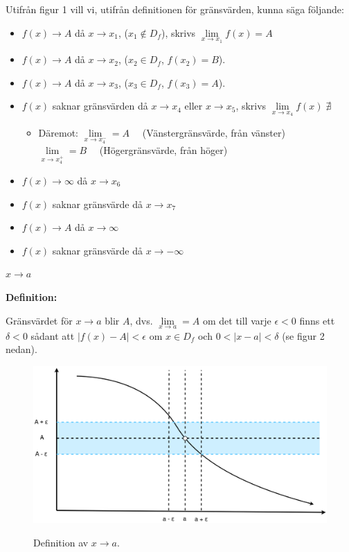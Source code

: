 \documentclass[swedish]{article}
\begin{document}
Utifrån figur 1 vill vi, utifrån definitionen för gränsvärden, kunna säga följande:

\begin{itemize}
    \item{$f(x) \to A$ då $x \to x_1$, ($x_1 \notin D_f$), skrivs $\lim\limits_{x \to x_1} f(x) = A$}
    \item{$f(x) \to A$ då $x \to x_2$, ($x_2 \in D_f$, $f(x_2) = B$).}
    \item{$f(x) \to A$ då $x \to x_3$, ($x_3 \in D_f$, $f(x_3) = A$).}
    \item{$f(x)$ saknar gränsvärden då $x \to x_4$ eller $x \to x_5$, skrivs $\lim\limits_{x \to x_4} f(x) \; \nexists$}
        \begin{itemize}
            \item{Däremot:
                \smallbreak
                $\lim\limits_{x \to x_4^-} = A \quad$ (Vänstergränsvärde, från vänster)\\

                $\lim\limits_{x \to x_4^+} = B \quad$ (Högergränsvärde, från höger)}
        \end{itemize}
    \smallbreak
    \item{$f(x) \to \infty$ då $x \to x_6$}
    \item{$f(x)$ saknar gränsvärde då $x \to x_7$}
    \item{$f(x) \to A$ då $x \to \infty$}
    \item{$f(x)$ saknar gränsvärde då $x \to -\infty$}
\end{itemize}

\bigbreak

{\large\underline{$x \to a$}}

\smallbreak

\textbf{Definition:}

\smallskip

Gränsvärdet för $x \to a$ blir $A$, dvs. $\lim\limits_{x \to a} = A$ om det till varje $\epsilon < 0$ finns ett $\delta < 0$ sådant att $|f(x) - A| < \epsilon$ om $x \in D_f$ och $0 < |x - a| < \delta$ (se figur 2 nedan). 

\begin{figure}[h!]
    \includegraphics[width=14cm]{./figurer/figur2.png}
    \label{fig:figur2}
    \caption{Definition av $x \to a$.}
\end{figure}
\end{document}
